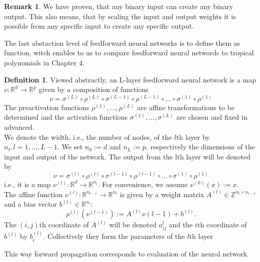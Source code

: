 \documentclass{article}
\theoremstyle{definition}
\newtheorem{definition}[theorem]{Definition}
\newtheorem{comment}[theorem]{Comment}
\newtheorem{remark}[theorem]{Remark}
\begin{document}
\begin{remark}
We have proven, that any binary input can create any binary output. This also means, that by scaling the input and output weights it is possible from any specific input to create any specific output.

\end{remark}

The last abstaction level of feedforward neural networks is to define them as function, witch enables to us to compare feedforward neural networds to tropical polynomials in Chapter $4$.

\begin{definition}
Viewed abstractly, an L-layer feedforward neural network is a map $\nu : \mathbb{R}^{d} \to \mathbb{R}^{p}$ given by a composition of functions
$$ \nu = \sigma^{(L)} \circ \rho^{(L)} \circ \sigma^{(L-1)} \circ \rho^{(L-1)} \circ \dots \circ \sigma^{(1)} \circ \rho^{(1)}$$
The preactivation functions $\rho^{(1)}, \dots , \rho^{(L)}$ are affine transformations to be determined and the activation functions $\sigma^{(1)}, \dots , \sigma^{(L)}$ are chosen and fixed in advanced. \\
We denote the width, i.e., the number of nodes, of the $l$th
layer by $n_l, l = 1, \dots , L-1$. We set $n_0 := d$ and $n_L := p$, respectively the dimensions of the input and output of the network. The output from the lth layer will be denoted by
$$\nu = \sigma^{(l)} \circ \rho^{(l)} \circ \sigma^{(l-1)} \circ \rho^{(l-1)} \circ \dots \circ \sigma^{(1)} \circ \rho^{(1)}$$
i.e., it is a map $\nu^{(l)} : \mathbb{R}^{d} \to \mathbb{R}^{n_l}$. For convenience, we assume $\nu^{(0)}(x) := x$. \\
The affine function $\nu^{(l)} : \mathbb{R}^{n_{l-1}} \to \mathbb{R}^{n_{l}}$ is given by a weight matrix $A^{(l)} \in \mathbb{Z}^{n_l \times n_{l-1}} $ and a bias vector $b^{(l)} \in \mathbb{R}^{n_l}$:
$$ \rho^{(l)}(\nu^{(l-1)}) := A^{(l)} \nu{(l-1)} + b^{(l)}. $$
The $(i, j)$th coordinate of $A^{(l)}$ will be denoted $a^{l}_{ij}$ and the $i$th coordinate of $b^{(l)}$ by $b^{(l)}_{i}$. Collectively they form the parameters of the $l$th layer
\end{definition}

This way forward propagation corresponds to evaluation of the neural network.

\end{document}

